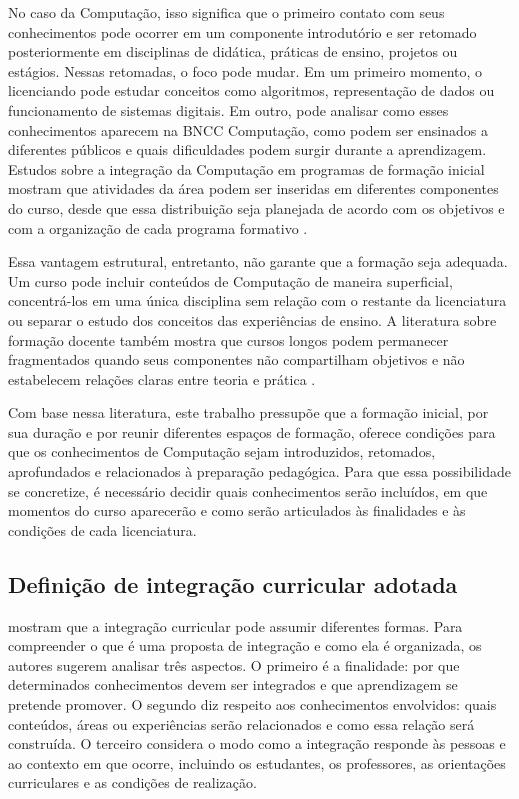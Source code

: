 No caso da Computação, isso significa que o primeiro contato com seus conhecimentos pode ocorrer em um componente introdutório e ser retomado posteriormente em disciplinas de didática, práticas de ensino, projetos ou estágios. Nessas retomadas, o foco pode mudar. Em um primeiro momento, o licenciando pode estudar conceitos como algoritmos, representação de dados ou funcionamento de sistemas digitais. Em outro, pode analisar como esses conhecimentos aparecem na BNCC Computação, como podem ser ensinados a diferentes públicos e quais dificuldades podem surgir durante a aprendizagem. Estudos sobre a integração da Computação em programas de formação inicial mostram que atividades da área podem ser inseridas em diferentes componentes do curso, desde que essa distribuição seja planejada de acordo com os objetivos e com a organização de cada programa formativo \cite{margulieux2022integrating}.

Essa vantagem estrutural, entretanto, não garante que a formação seja adequada. Um curso pode incluir conteúdos de Computação de maneira superficial, concentrá-los em uma única disciplina sem relação com o restante da licenciatura ou separar o estudo dos conceitos das experiências de ensino. A literatura sobre formação docente também mostra que cursos longos podem permanecer fragmentados quando seus componentes não compartilham objetivos e não estabelecem relações claras entre teoria e prática \cite{hammerness2006coherence}.

Com base nessa literatura, este trabalho pressupõe que a formação inicial, por sua duração e por reunir diferentes espaços de formação, oferece condições para que os conhecimentos de Computação sejam introduzidos, retomados, aprofundados e relacionados à preparação pedagógica. Para que essa possibilidade se concretize, é necessário decidir quais conhecimentos serão incluídos, em que momentos do curso aparecerão e como serão articulados às finalidades e às condições de cada licenciatura.

\subsection{Definição de integração curricular adotada}
\label{subsec:definicao-integracao-curricular}

 mostram que a integração curricular pode assumir diferentes formas. Para compreender o que é uma proposta de integração e como ela é organizada, os autores sugerem analisar três aspectos. O primeiro é a finalidade: por que determinados conhecimentos devem ser integrados e que aprendizagem se pretende promover. O segundo diz respeito aos conhecimentos envolvidos: quais conteúdos, áreas ou experiências serão relacionados e como essa relação será construída. O terceiro considera o modo como a integração responde às pessoas e ao contexto em que ocorre, incluindo os estudantes, os professores, as orientações curriculares e as condições de realização.


